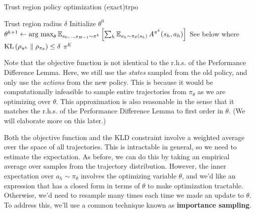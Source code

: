 \documentclass[\main/main]{subfiles}
\begin{document}
\begin{definition}{Trust region policy optimization (exact)}{trpo}
    \begin{algorithmic}
        \Require Trust region radius $\delta$
        \State Initialize $\theta^0$
        \State $\theta^{k+1} \gets \operatorname*{\textrm{arg\ max}}_{\theta} \operatorname*{\mathbb{E}}_{s_0, \dots, s_{H-1} \sim \pi^k} \left[ \sum_h \operatorname*{\mathbb{E}}_{a_h \sim \pi_\theta(s_h)} A^{\pi^k}(s_h, a_h) \right]$
        \Comment See below
        \State where $\mathrm{KL}\left(\rho_{\pi^k} \parallel \rho_{\pi_{\theta}}\right) \le \delta$
        \EndFor
        \State \Return $\pi^K$
    \end{algorithmic}

    Note that the objective function is not identical to the r.h.s. of the Performance Difference Lemma. Here, we still use the \emph{states} sampled from the old policy, and only use the \emph{actions} from the new policy.
    This is because it would be computationally infeasible to sample entire trajectories from $\pi_\theta$ as we are optimizing over $\theta$.
    This approximation is also reasonable in the sense that it matches the r.h.s. of the Performance Difference Lemma to first order in $\theta$. (We will elaborate more on this later.)
\end{definition}

Both the objective function and the KLD constraint involve a weighted average over the space of all trajectories. This is intractable in general, so we need to estimate the expectation.
As before, we can do this by taking an empirical average over samples from the trajectory distribution.
However, the inner expectation over $a_h \sim \pi_{\theta}$ involves the optimizing variable $\theta$, and we'd like an expression that has a closed form in terms of $\theta$ to make optimization tractable. Otherwise, we'd need to resample many times each time we made an update to $\theta$.
To address this, we'll use a common technique known as \textbf{importance sampling}.
\end{document}
